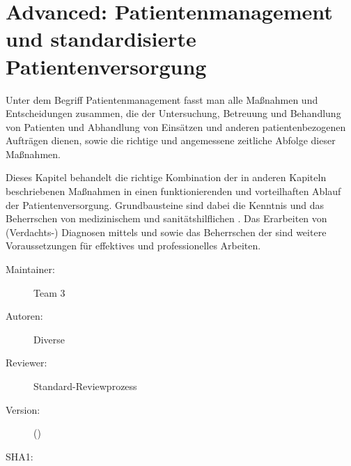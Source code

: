 \def\ChapterCode{APAM}
	\chapter
[\CO{[APAM]} Adavnced: Patientenmanagement und standardisierte Patientenversorgung]
{Advanced: Patientenmanagement und standardisierte Patientenversorgung}
\label{chp:APAM}

\ChapterIntro
{%
Unter dem Begriff Patientenmanagement fasst man alle
Maßnahmen und Entscheidungen zusammen, die der Untersuchung,
Betreuung und Behandlung von Patienten und Abhandlung von
Einsätzen und anderen patientenbezogenen Aufträgen dienen,
sowie die richtige und angemessene zeitliche Abfolge dieser
Maßnahmen.

Dieses Kapitel behandelt die richtige Kombination der in
anderen Kapiteln beschriebenen Maßnahmen in einen
funktionierenden und vorteilhaften Ablauf der
Patientenversorgung. Grundbausteine sind dabei die Kenntnis
und das Beherrschen von medizinischem  und
sanitätshilflichen . Das Erarbeiten von
(Verdachts-) Diagnosen mittels  und
 sowie das Beherrschen der
 sind weitere
Voraussetzungen für effektives und professionelles Arbeiten.
}
{%
\begin{description}
  \item[Maintainer:] Team 3
  \item[Autoren:] Diverse
  \item[Reviewer:] Standard-Reviewprozess
  \item[Version:] {\VarDocVersionTypeName} ({\VarDocVersionTypeDescription})
  \item[SHA1:] {\DocGitCommit}
\end{description}

{\TxTeilkapitelAASS}}








\clearpage %


\pagestyle{empty}
\vfill

